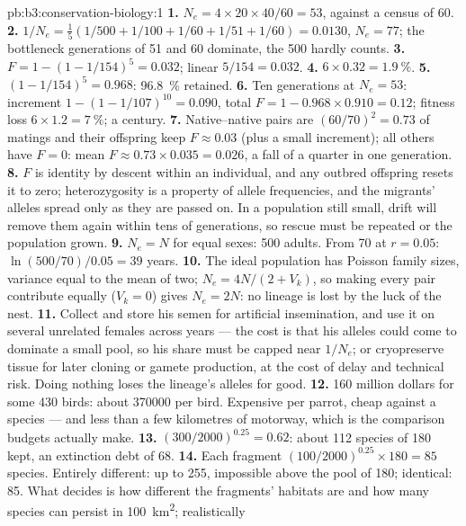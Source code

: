 \begin{solution}{pb:b3:conservation-biology:1}
\textbf{1.} $N_{e} = 4\times 20\times 40/60 = 53$, against a census of 60.
\textbf{2.} $1/N_{e} = \tfrac{1}{5}(1/500 + 1/100 + 1/60 + 1/51 + 1/60) =
0.0130$, $N_{e} = 77$; the bottleneck generations of 51 and 60
dominate, the 500 hardly counts.
\textbf{3.} $F = 1 - (1 - 1/154)^{5} = 0.032$; linear $5/154 = 0.032$.
\textbf{4.} $6\times 0.32 = \qty{1.9}{\%}$.
\textbf{5.} $(1 - 1/154)^{5} = 0.968$: \qty{96.8}{\%} retained.
\textbf{6.} Ten generations at $N_{e} = 53$: increment $1 - (1 -
1/107)^{10} = 0.090$, total $F = 1 - 0.968\times 0.910 = 0.12$; fitness
loss $6\times 1.2 = \qty{7}{\%}$; a century.
\textbf{7.} Native--native pairs are $(60/70)^{2} = 0.73$ of matings and
their offspring keep $F \approx 0.03$ (plus a small increment); all
others have $F = 0$: mean $F \approx 0.73\times 0.035 = 0.026$, a fall
of a quarter in one generation.
\textbf{8.} $F$ is identity by descent within an individual, and any
outbred offspring resets it to zero; heterozygosity is a property of
allele frequencies, and the migrants' alleles spread only as they are
passed on. In a population still small, drift will remove them again
within tens of generations, so rescue must be repeated or the
population grown.
\textbf{9.} $N_{e} = N$ for equal sexes: 500 adults. From 70 at $r =
0.05$: $\ln(500/70)/0.05 = 39$ years.
\textbf{10.} The ideal population has Poisson family sizes, variance
equal to the mean of two; $N_{e} = 4N/(2 + V_{k})$, so making every pair
contribute equally ($V_{k} = 0$) gives $N_{e} = 2N$: no lineage is
lost by the luck of the nest.
\textbf{11.} Collect and store his semen for artificial insemination,
and use it on several unrelated females across years --- the cost is
that his alleles could come to dominate a small pool, so his share must
be capped near $1/N_{e}$; or cryopreserve tissue for later cloning or
gamete production, at the cost of delay and technical risk. Doing
nothing loses the lineage's alleles for good.
\textbf{12.} \qty{160}{} million dollars for some 430 birds: about
\num{370000} per bird. Expensive per parrot, cheap against a species
--- and less than a few kilometres of motorway, which is the comparison
budgets actually make.
\textbf{13.} $(300/2000)^{0.25} = 0.62$: about 112 species of 180 kept,
an extinction debt of 68.
\textbf{14.} Each fragment $(100/2000)^{0.25}\times 180 = 85$ species.
Entirely different: up to 255, impossible above the pool of 180;
identical: 85. What decides is how different the fragments' habitats
are and how many species can persist in \qty{100}{km^2}; realistically

\end{solution}
